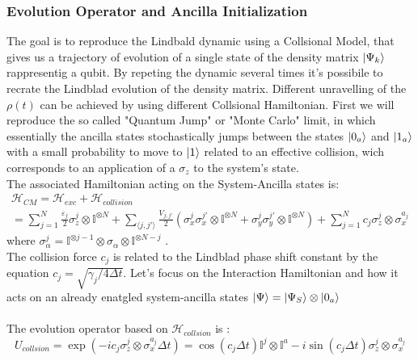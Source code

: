 \documentclass[a4paper,12pt]{article}
\begin{document}
	\subsubsection{Evolution Operator and Ancilla Initialization}
	\label{sub:Evolution_Operator_and_Ancilla_Initialization_QJ}
	The goal is to reproduce the Lindbald dynamic using a Collsional Model, that gives us a trajectory of evolution of a single state of the density matrix $ \ket{\Psi_k} $ rappresentig a qubit. By repeting the dynamic several times it's possibile to recrate the Lindblad evolution of the density matrix.
	Different unravelling of the $ \rho (t) $ can be achieved by using different Collsional Hamiltonian. First we will reproduce the so called "Quantum Jump" or "Monte Carlo" limit, in which essentially the ancilla states stochastically jumps between the states $ \ket{0_a} $ and $ \ket{1_a} $ with a small probability to move to $ \ket{1} $ related to an effective collision, wich corresponds to an application of a $ \sigma_{z} $ to the system's state. \\
	The associated Hamiltonian acting on the System-Ancilla states is:
	\begin{gather}
		\mathcal{H}_{CM} = \mathcal{H}_{exc} + \mathcal{H}_{collision} \\
		= \sum_{j=1}^{N} {\frac{\varepsilon_j}{2} \sigma_{z}^{j} \otimes \mathbb{I}^{\otimes N} } + \sum_{\langle j,j' \rangle} {\frac{V_{j,j'}}{2} \left( \sigma_{x}^{j}\sigma_{x}^{j'} \otimes \mathbb{I}^{\otimes N} + \sigma_{y}^{j}\sigma_{y}^{j'} \otimes \mathbb{I}^{\otimes N} \right)} + \sum_{j=1}^{N}{c_j \sigma_{z}^{j} \otimes \sigma_{x}^{a_j}}
		\label{eq:CM_hamiltonian_QJ}
	\end{gather}
	where $ \sigma_{\alpha}^j = \mathbb{I}^{\otimes j-1} \otimes \sigma_{\alpha} \otimes \mathbb{I}^{\otimes N-j}  $ . \\
	The collision force $ c_j $ is related to the Lindblad phase shift constant by the equation $ c_j = \sqrt{\gamma_j / 4 \Delta t} $.
	Let's focus on the Interaction Hamiltonian and how it acts on an already enatgled system-ancilla states $ \ket{\Psi} = \ket{\Psi_S} \otimes \ket{0_a} $ \\
	\\
	The evolution operator based on $ \mathcal{H}_{collsion} $ is :
	\begin{equation}
		U_{collsion} = \exp \left(-i c_j \sigma_{z}^{j} \otimes \sigma_{x}^{a_j} \Delta t\right) = \cos \left(c_j \Delta t \right) \mathbb{I}^j \otimes \mathbb{I}^a - i \sin \left(c_j \Delta t \right) \sigma_{z}^{j} \otimes \sigma_{x}^{a_j}
		\label{eq:U_QJ}
	\end{equation}
\end{document}
